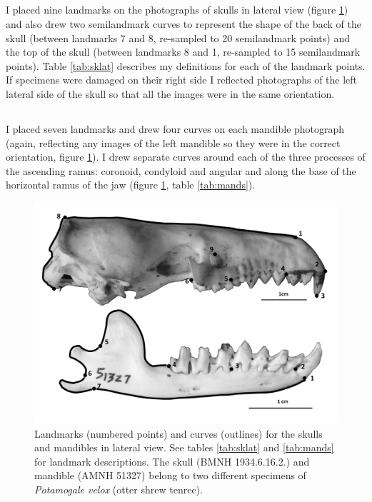 \subsection{}
	I placed nine landmarks on the photographs of skulls in lateral view (figure \ref{fig:sklat_mands}) and also drew two semilandmark curves to represent the shape of the back of the skull (between landmarks 7 and 8, re-sampled to 20 semilandmark points) and the top of the skull (between landmarks 8 and 1, re-sampled to 15 semilandmark points). Table \ref{tab:sklat} describes my definitions for each of the landmark points.
	If specimens were damaged on their right side I reflected photographs of the left lateral side of the skull so that all the images were in the same orientation.


\subsection{}
	I placed seven landmarks and drew four curves on each mandible photograph (again, reflecting any images of the left mandible so they were in the correct orientation, figure \ref{fig:sklat_mands}). I drew separate curves around each of the three processes of the ascending ramus: coronoid, condyloid and angular and along the base of the horizontal ramus of the jaw (figure \ref{fig:sklat_mands}, table \ref{tab:mands}). 	

\begin{figure}[!htbp]
	\centering
	\includegraphics[width=1\linewidth]{Methods/figures/Sklat+mands_combined_BW.png}
	\caption[Lateral skulls and mandibles landmarks]
	{Landmarks (numbered points) and curves (outlines) for the skulls and mandibles in lateral view. See tables \ref{tab:sklat} and \ref{tab:mands} for landmark descriptions. The skull (BMNH 1934.6.16.2.) and mandible (AMNH 51327) belong to two different specimens of \textit{Potamogale velox} (otter shrew tenrec).}
	\label{fig:sklat_mands}
\end{figure}

